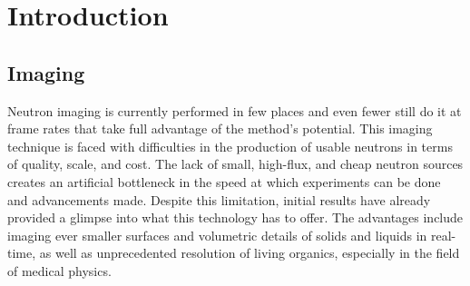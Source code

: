 \label{sec:introduction}
\section{Introduction}

\subsection{Imaging}

Neutron imaging is currently performed in few places and even fewer still do it at frame rates that take full advantage of the method's potential. This imaging technique is faced with difficulties in the production of usable neutrons in terms of quality, scale, and cost. The lack of small, high-flux, and cheap neutron sources creates an artificial bottleneck in the speed at which experiments can be done and advancements made. Despite this limitation, initial results have already provided a glimpse into what this technology has to offer. The advantages include imaging ever smaller surfaces and volumetric details of solids and liquids in real-time, as well as unprecedented resolution of living organics, especially in the field of medical physics.

